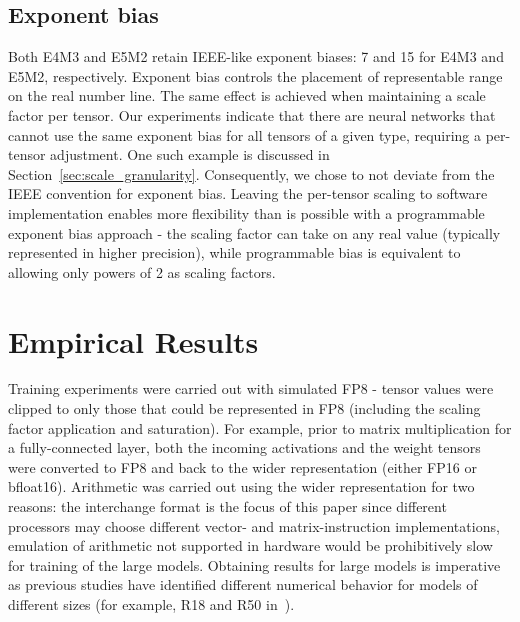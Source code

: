 \subsection{Exponent bias}
\label{sec:exponent_bias}
Both E4M3 and E5M2 retain IEEE-like exponent biases: 7 and 15 for E4M3 and E5M2, respectively. Exponent bias controls the placement of representable range on the real number line. The same effect is achieved when maintaining a scale factor per tensor. Our experiments indicate that there are neural networks that cannot use the same exponent bias for all tensors of a given type, requiring a per-tensor adjustment. One such example is discussed in Section~\ref{sec:scale_granularity}. Consequently, we chose to not deviate from the IEEE convention for exponent bias. Leaving the per-tensor scaling to software implementation enables more flexibility than is possible with a programmable exponent bias approach - the scaling factor can take on any real value (typically represented in higher precision), while programmable bias is equivalent to allowing only powers of 2 as scaling factors.

\section{Empirical Results}
\label{sec:results}
Training experiments were carried out with simulated FP8 - tensor values were clipped to only those that could be represented in FP8 (including the scaling factor application and saturation). For example, prior to matrix multiplication for a fully-connected layer, both the incoming activations and the weight tensors were converted to FP8 and back to the wider representation (either FP16 or bfloat16). Arithmetic was carried out using the wider representation for two reasons: the interchange format is the focus of this paper since different processors may choose different vector- and matrix-instruction implementations, emulation of arithmetic not supported in hardware would be prohibitively slow for training of the large models. Obtaining results for large models is imperative as previous studies have identified different numerical behavior for models of different sizes (for example, R18 and R50 in~\cite{fp8_intel_2019}).

